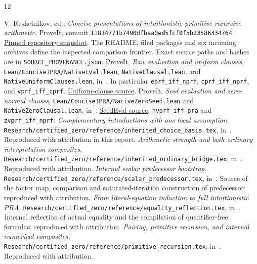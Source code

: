 \documentclass[11pt,letterpaper]{article}
\theoremstyle{definition}\newtheorem{definition}[theorem]{Definition}
\theoremstyle{remark}\newtheorem{remark}[theorem]{Remark}
\begin{document}
\clearpage
\begin{thebibliography}{12}\raggedright
{} V. Reshetnikov, ed., \emph{Concise presentations of intuitionistic
primitive recursive arithmetic}, ProveIt, commit
\texttt{11814771b7490dfbea0ed5fcf0f5b23586334764}.
\href{https://github.com/VladimirReshetnikov/ProveIt/tree/11814771b7490dfbea0ed5fcf0f5b23586334764/Logic/PrimitiveRecursiveArithmetic/ConciseIPRA}{Pinned repository snapshot}.
The README, filed packages and six incoming archives define the inspected
comparison frontier. Exact source paths and hashes are in
\texttt{SOURCE\_PROVENANCE.json}.
 ProveIt, \emph{Raw evaluation and uniform clauses},
\texttt{Lean/ConciseIPRA/NativeEval.lean},
\texttt{NativeClausal.lean}, and \texttt{NativeUniformClauses.lean},
in~\cite{repo}. In particular \texttt{eprf\_iff\_nprf},
\texttt{cprf\_iff\_nprf}, and \texttt{vprf\_iff\_cprf}.
\href{https://github.com/VladimirReshetnikov/ProveIt/blob/11814771b7490dfbea0ed5fcf0f5b23586334764/Logic/PrimitiveRecursiveArithmetic/ConciseIPRA/Lean/ConciseIPRA/NativeUniformClauses.lean}{Uniform-clause source}.
 ProveIt, \emph{Seed evaluation and zero-normal clauses},
\texttt{Lean/ConciseIPRA/NativeZeroSeed.lean} and
\texttt{NativeZeroClausal.lean}, in~\cite{repo}.
\href{https://github.com/VladimirReshetnikov/ProveIt/blob/11814771b7490dfbea0ed5fcf0f5b23586334764/Logic/PrimitiveRecursiveArithmetic/ConciseIPRA/Lean/ConciseIPRA/NativeZeroSeed.lean}{SeedEval source};
\texttt{nvprf\_iff\_pra} and \texttt{zvprf\_iff\_nprf}.
 \emph{Complementary introductions with one local assumption},
\texttt{Research/certified\_zero/reference/inherited\_choice\_basis.tex},
in~\cite{repo}. Reproduced with attribution in this report.
 \emph{Arithmetic strength and both ordinary interpretation
composites}, \texttt{Research/certified\_zero/reference/inherited\_ordinary\_bridge.tex},
in~\cite{repo}. Reproduced with attribution.
 \emph{Internal scalar predecessor bootstrap},
\texttt{Research/certified\_zero/reference/scalar\_predecessor.tex},
in~\cite{repo}. Source of the factor map, comparison and saturated-iteration
construction of predecessor; reproduced with attribution.
 \emph{From literal-equation induction to full intuitionistic
PRA}, \texttt{Research/certified\_zero/reference/equality\_reflection.tex},
in~\cite{repo}. Internal reflection of actual equality and the compilation
of quantifier-free formulas; reproduced with attribution.
 \emph{Pairing, primitive recursion, and internal numerical
composites}, \texttt{Research/certified\_zero/reference/primitive\_recursion.tex},
in~\cite{repo}. Reproduced with attribution.
\end{thebibliography}
\end{document}
